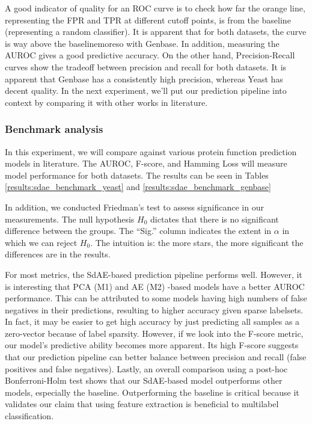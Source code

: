 \par A good indicator of quality for an ROC curve is to check how far the
orange line, representing the FPR and TPR at different cutoff points, is from
the baseline (representing a random classifier). It is apparent that for both
datasets, the curve is way above the baseline\textemdash moreso with
Genbase. In addition, measuring the AUROC gives a good predictive accuracy.
On the other hand, Precision-Recall curves show the tradeoff between
precision and recall for both datasets. It is apparent that Genbase has a
consistently high precision, whereas Yeast has decent quality. In the next
experiment, we'll put our prediction pipeline into context by comparing it
with other works in literature.


\subsubsection{Benchmark analysis}



\par In this experiment, we will compare against various protein function
prediction models in literature. The AUROC, F-score, and Hamming Loss will
measure model performance for both datasets. The results can be seen in
Tables \ref{results:sdae_benchmark_yeast} and
\ref{results:sdae_benchmark_genbase}

\par In addition, we conducted Friedman's test to assess significance in our
measurements. The null hypothesis $H_{0}$ dictates that there is no
significant difference between the groups. The ``Sig.'' column indicates the
extent in $\alpha$ in which we can reject $H_{0}$. The intuition is: the more
stars, the more significant the differences are in the results.

\par For most metrics, the SdAE-based prediction pipeline performs well.
However, it is interesting that PCA (M1) and AE (M2) -based models have a
better AUROC performance. This can be attributed to some models having high
numbers of false negatives in their predictions, resulting to higher
accuracy given sparse labelsets. In fact, it may be easier to get high accuracy
by just predicting all samples as a zero-vector because of label sparsity.
However, if we look into the F-score metric, our model's predictive ability
becomes more apparent. Its high F-score suggests that our prediction pipeline
can better balance between precision and recall (false positives and false
negatives). Lastly, an overall comparison using a post-hoc Bonferroni-Holm test
shows that our SdAE-based model outperforms other models, especially the
baseline. Outperforming the baseline is critical because it validates our claim
that using feature extraction is beneficial to multilabel classification.

